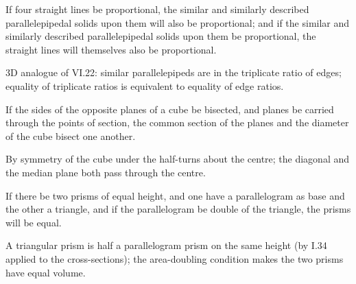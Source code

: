 \documentclass{rrxiv}
\begin{document}
\begin{claim}
\label{prop:XI.37}
If four straight lines be proportional, the similar and similarly
described parallelepipedal solids upon them will also be
proportional; and if the similar and similarly described
parallelepipedal solids upon them be proportional, the straight lines
will themselves also be proportional.
\end{claim}
\begin{evidence}[Proof of XI.37]
\label{ev:XI.37}
3D analogue of VI.22: similar parallelepipeds are in the triplicate
ratio of edges; equality of triplicate ratios is equivalent to
equality of edge ratios.
\end{evidence}

\begin{claim}
\label{prop:XI.38}
If the sides of the opposite planes of a cube be bisected, and planes
be carried through the points of section, the common section of the
planes and the diameter of the cube bisect one another.
\end{claim}
\begin{evidence}[Proof of XI.38]
\label{ev:XI.38}
By symmetry of the cube under the half-turns about the centre; the
diagonal and the median plane both pass through the centre.
\end{evidence}

\begin{claim}
\label{prop:XI.39}
If there be two prisms of equal height, and one have a parallelogram
as base and the other a triangle, and if the parallelogram be double
of the triangle, the prisms will be equal.
\end{claim}
\begin{evidence}[Proof of XI.39]
\label{ev:XI.39}
A triangular prism is half a parallelogram prism on the same height
(by I.34 applied to the cross-sections); the area-doubling condition
makes the two prisms have equal volume.
\end{evidence}
%
%
\end{document}
